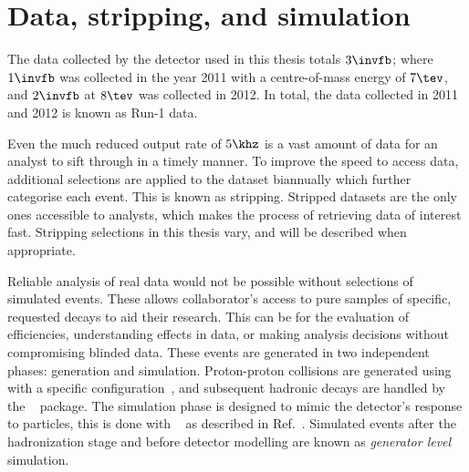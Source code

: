 \section{Data, stripping, and simulation}

The data collected by the \lhcb detector used in this thesis totals $3\invfb$; where $1\invfb$ was
collected in the year 2011 with a centre-of-mass energy of $7\tev$, and $2\invfb$ at $8\tev$ was
collected in 2012.
In total, the data collected in 2011 and 2012 is known as Run-1 data.

Even the much reduced \hlttwo output rate of $5\khz$ is a vast amount of data for an
analyst to sift through in a timely manner.
To improve the speed to access data, additional selections are applied to the dataset biannually
which further categorise each event.
This is known as stripping.
Stripped datasets are the only ones accessible to analysts, which makes the process of retrieving
data of interest fast.
Stripping selections in this thesis vary, and will be described when appropriate.


Reliable analysis of real data would not be possible without selections of simulated events.
These allows collaborator's access to pure samples of specific, requested decays to aid their
research.
This can be for the evaluation of efficiencies, understanding effects in data, or making analysis
decisions without compromising blinded data.
These events are generated in two independent phases: generation and simulation.
Proton-proton collisions are generated using \pythia~\cite{Sjostrand:2006za,*Sjostrand:2007gs}
with a specific \lhcb configuration~\cite{LHCb-PROC-2010-056},
and subsequent hadronic decays are handled by the \evtgen~\cite{Lange:2001uf} package.
The simulation phase is designed to mimic the \lhcb detector's response to particles, this is done
with \geant~\cite{Allison:2006ve,*Agostinelli:2002hh} as described in
Ref.~\cite{LHCb-PROC-2011-006}.
Simulated events after the hadronization stage and before detector modelling are known as
\emph{generator level} simulation.




